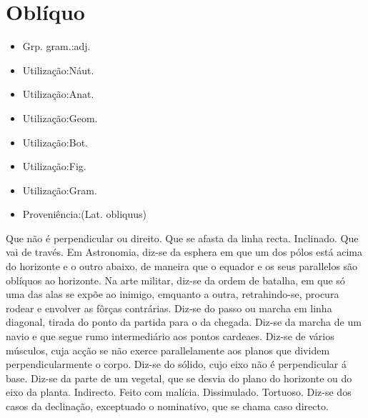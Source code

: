 \section{Oblíquo}
\begin{itemize}
\item {Grp. gram.:adj.}
\end{itemize}
\begin{itemize}
\item {Utilização:Náut.}
\end{itemize}
\begin{itemize}
\item {Utilização:Anat.}
\end{itemize}
\begin{itemize}
\item {Utilização:Geom.}
\end{itemize}
\begin{itemize}
\item {Utilização:Bot.}
\end{itemize}
\begin{itemize}
\item {Utilização:Fig.}
\end{itemize}
\begin{itemize}
\item {Utilização:Gram.}
\end{itemize}
\begin{itemize}
\item {Proveniência:(Lat. \textunderscore obliquus\textunderscore )}
\end{itemize}
Que não é perpendicular ou direito.
Que se afasta da linha recta.
Inclinado.
Que vai de través.
Em Astronomia, diz-se da esphera em que um dos pólos está acima do horizonte e o outro abaixo, de maneira que o equador e os seus parallelos são oblíquos ao horizonte.
Na arte militar, diz-se da ordem de batalha, em que só uma das alas se expõe ao inimigo, emquanto a outra, retrahindo-se, procura rodear e envolver as fôrças contrárias.
Diz-se do passo ou marcha em linha diagonal, tirada do ponto da partida para o da chegada.
Diz-se da marcha de um navio e que segue rumo intermediário aos pontos cardeaes.
Diz-se de vários músculos, cuja acção se não exerce parallelamente aos planos que dividem perpendicularmente o corpo.
Diz-se do sólido, cujo eixo não é perpendicular á base.
Diz-se da parte de um vegetal, que se desvia do plano do horizonte ou do eixo da planta.
Indirecto.
Feito com malícia.
Dissimulado.
Tortuoso.
Diz-se dos casos da declinação, exceptuado o nominativo, que se chama caso \textunderscore directo\textunderscore .

